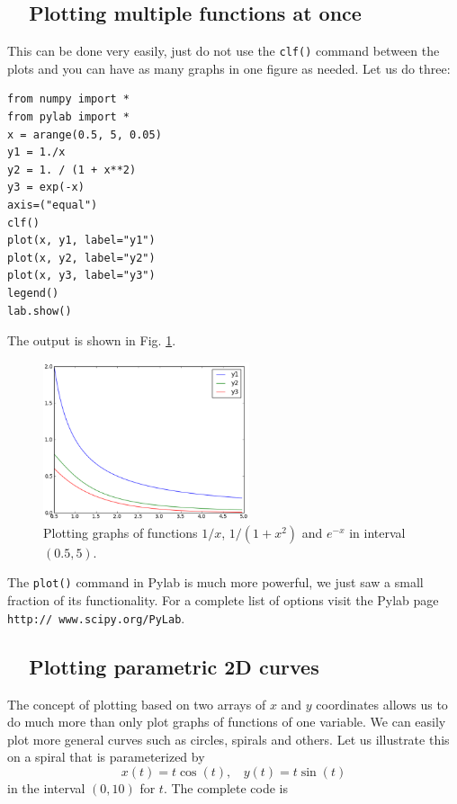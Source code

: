 \subsection{\ \ Plotting multiple functions at once}

This can be done very easily, just do not use the {\tt clf()}
command between the plots and you can have as many graphs 
in one figure as needed. Let us do three:

\begin{verbatim}
from numpy import *
from pylab import *
x = arange(0.5, 5, 0.05)
y1 = 1./x
y2 = 1. / (1 + x**2)
y3 = exp(-x)
axis=("equal")
clf()
plot(x, y1, label="y1")
plot(x, y2, label="y2")
plot(x, y3, label="y3")
legend()
lab.show()
\end{verbatim}
\noindent
The output is shown in Fig. \ref{fig:plot7}.
\newpage

\begin{figure}[!ht]
\begin{center}
\includegraphics[width=0.54\textwidth]{imgp/plot7.png}
\end{center}
\vspace{-4mm}
\caption{Plotting graphs of functions $1/x$, $1 / (1 + x^2)$ and $e^{-x}$ in interval $(0.5, 5)$.}
\label{fig:plot7}
\vspace{-2mm}
\end{figure}
\noindent
The {\tt plot()} command in Pylab is much more powerful, we just saw a small 
fraction of its functionality. For a complete list of options 
visit the Pylab page {\tt http:// www.scipy.org/PyLab}.

\subsection{\ \ Plotting parametric 2D curves}\label{subsec:planarcurves}

The concept of plotting based on two arrays of $x$ and $y$ coordinates
allows us to do much more than only plot graphs of functions of one variable.
We can easily plot more general curves such as circles, spirals and others.
Let us illustrate this on a spiral that is parameterized 
by 
$$
x(t) = t \cos(t), \ \ \ \ 
y(t) = t \sin(t)
$$ 
in the interval $(0, 10)$ for $t$. The complete code is

